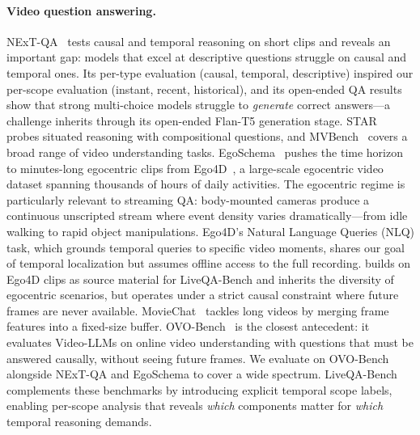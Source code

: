 \paragraph{Video question answering.}
NExT-QA~\cite{xiao2021nextqa} tests causal and temporal reasoning on short clips and reveals an important gap: models that excel at descriptive questions struggle on causal and temporal ones.
Its per-type evaluation (causal, temporal, descriptive) inspired our per-scope evaluation (instant, recent, historical), and its open-ended QA results show that strong multi-choice models struggle to \emph{generate} correct answers---a challenge \ours inherits through its open-ended Flan-T5 generation stage.
STAR~\cite{wu2021star} probes situated reasoning with compositional questions, and MVBench~\cite{li2024mvbench} covers a broad range of video understanding tasks.
EgoSchema~\cite{mangalam2023egoschema} pushes the time horizon to minutes-long egocentric clips from Ego4D~\cite{grauman2022ego4d}, a large-scale egocentric video dataset spanning thousands of hours of daily activities.
The egocentric regime is particularly relevant to streaming QA: body-mounted cameras produce a continuous unscripted stream where event density varies dramatically---from idle walking to rapid object manipulations.
Ego4D's Natural Language Queries (NLQ) task, which grounds temporal queries to specific video moments, shares our goal of temporal localization but assumes offline access to the full recording.
\ours builds on Ego4D clips as source material for LiveQA-Bench and inherits the diversity of egocentric scenarios, but operates under a strict causal constraint where future frames are never available.
MovieChat~\cite{song2024moviechat} tackles long videos by merging frame features into a fixed-size buffer.
OVO-Bench~\cite{li2025ovobench} is the closest antecedent: it evaluates Video-LLMs on online video understanding with questions that must be answered causally, without seeing future frames.
We evaluate on OVO-Bench alongside NExT-QA and EgoSchema to cover a wide spectrum.
LiveQA-Bench complements these benchmarks by introducing explicit temporal scope labels, enabling per-scope analysis that reveals \emph{which} components matter for \emph{which} temporal reasoning demands.

